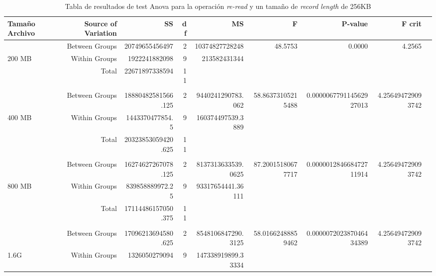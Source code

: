 \begin{landscape}
\begin{table}[!htp]\centering
\caption{Tabla de resultados de test Anova para la operación \textit{re-read} y un tamaño de \textit{record length} de 256KB}\label{tab: }
\scriptsize
\begin{tabular}{lrrrrrrrr}\toprule
Tamaño Archivo &Source of Variation &SS &df &MS &F &P-value &F crit \\\midrule
&Between Groups &20749655456497 &2 &10374827728248 &48.5753 &0.0000 &4.2565 \\
200 MB &Within Groups &1922241882098 &9 &213582431344 & & & \\
&Total &22671897338594 &11 & & & & \\
& & & & & & & \\
&Between Groups &18880482581566.125 &2 &9440241290783.062 &58.86373105215488 &0.000006779114562927013 &4.256494729093742 \\
400 MB &Within Groups &1443370477854.5 &9 &160374497539.3889 & & & \\
&Total &20323853059420.625 &11 & & & & \\
& & & & & & & \\
&Between Groups &16274627267078.125 &2 &8137313633539.0625 &87.20015180677717 &0.000001284668472711914 &4.256494729093742 \\
800 MB &Within Groups &839858889972.25 &9 &93317654441.36111 & & & \\
&Total &17114486157050.375 &11 & & & & \\
& & & & & & & \\
&Between Groups &17096213694580.625 &2 &8548106847290.3125 &58.01662488859462 &0.000007202387046434389 &4.256494729093742 \\
1.6G &Within Groups &1326050279094 &9 &147338919899.33334 & & & \\

\end{tabular}
\end{table}
\end{landscape}
